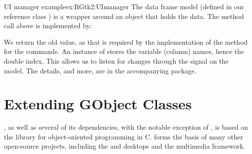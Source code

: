 \begin{example}{UI manager example}{ex:RGtk2:UImanager}
The data frame model (defined in our reference class ) is a wrapper around an
 object that holds the data. The method call
above is implemented by:
\begin{Schunk}
\end{Schunk}
We return the old value, as that is required by the implementation of
the  method for the commands. An instance of
 stores the variable (column) names, hence the
double index. This allows us to listen for changes through the
 signal on the model. The details, and more, are
in the accompanying package.









\end{example}


\chapter{Extending GObject Classes}
\label{chapter:extending-GTK}
\label{sec:gtk:extending-classes}

\GTK, as well as several of its dependencies, with the notable
exception of , is based on the 
library for object-oriented programming in C.  forms the
basis of many other open-source projects, including the 
and  desktops and the  multimedia framework.

